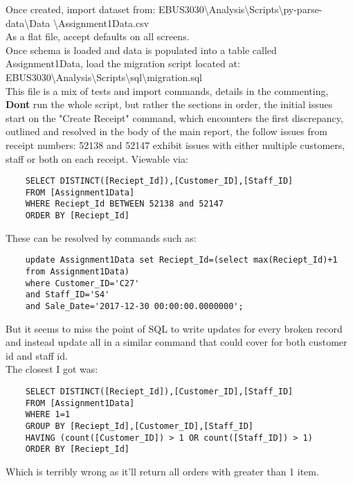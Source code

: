 \documentclass{article}
\begin{document}
    Once created, import dataset from:
    EBUS3030\textbackslash Analysis\textbackslash Scripts\textbackslash py-parse-data\textbackslash Data \textbackslash Assignment1Data.csv
    \\
    As a flat file, accept defaults on all screens.
    \\
    Once schema is loaded and data is populated into a table called Assignment1Data,
    load the migration script located at:
    \\
    EBUS3030\textbackslash Analysis\textbackslash Scripts\textbackslash sql\textbackslash migration.sql
    \\
    This file is a mix of tests and import commands, details in the commenting,
    \textbf{Dont} run the whole script, but rather the sections in order,
    the initial issues start on the "Create Receipt" command, which encounters
    the first discrepancy, outlined and resolved in the body of the main report,
    the follow issues from receipt numbers: 52138 and 52147 exhibit issues with
    either multiple customers, staff or both on each receipt. Viewable via:
    \begin{verbatim}
    SELECT DISTINCT([Reciept_Id]),[Customer_ID],[Staff_ID]
    FROM [Assignment1Data]
    WHERE Reciept_Id BETWEEN 52138 and 52147                 
    ORDER BY [Reciept_Id]
    \end{verbatim}
    These can be resolved by commands such as:
    \begin{verbatim}
    update Assignment1Data set Reciept_Id=(select max(Reciept_Id)+1 
    from Assignment1Data) 
    where Customer_ID='C27' 
    and Staff_ID='S4' 
    and Sale_Date='2017-12-30 00:00:00.0000000';
    \end{verbatim}
    But it seems to miss the point of SQL to write updates for every broken record 
    and instead update all in a similar command that could cover for both customer id
    and staff id.
    \\
    The closest I got was:
    \begin{verbatim}
    SELECT DISTINCT([Reciept_Id]),[Customer_ID],[Staff_ID]
    FROM [Assignment1Data]
    WHERE 1=1
    GROUP BY [Reciept_Id],[Customer_ID],[Staff_ID]
    HAVING (count([Customer_ID]) > 1 OR count([Staff_ID]) > 1)
    ORDER BY [Reciept_Id]
    \end{verbatim}
    Which is terribly wrong as it'll return all orders with greater than 1 item.
    
\end{document}
